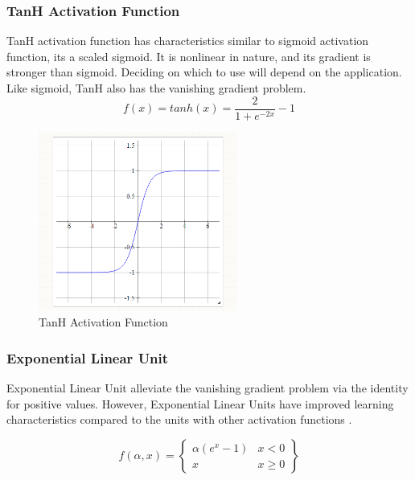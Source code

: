 \documentclass[12pt, a4paper]{report}
\begin{document}
\subsubsection{TanH Activation Function}\label{sec:tanh}
TanH activation function has characteristics similar to sigmoid activation function, its a scaled sigmoid. It is nonlinear in nature, and its gradient is stronger than sigmoid. Deciding on which to use will depend on the application. Like sigmoid, TanH also has the vanishing gradient problem.
\begin{equation}\label{eq:tanh}
f(x) = tanh(x)=\frac{2}{1+e^{-2x}} -1
\end{equation}
\begin{figure}[h]
\centering
\includegraphics[width=6.5cm]{tanh.png}
\caption{TanH Activation Function}
\label{fig:tanh}
\end{figure} 

\subsubsection{Exponential Linear Unit}\label{sec:ELU}
Exponential Linear Unit alleviate the vanishing gradient problem via the identity for positive values. However, Exponential Linear Units have improved learning characteristics compared to the units with other activation functions \cite{ELU}.\\ \par
\begin{equation}\label{eq:ELU}
f(\alpha ,x) = \begin{Bmatrix}
\alpha(e^{x}-1) & x<0\\ 
x & x\geq 0 
\end{Bmatrix}
\end{equation}
\end{document}
